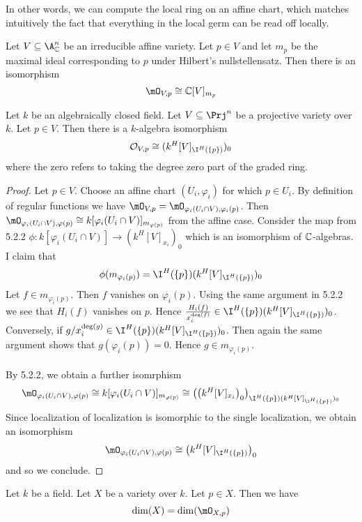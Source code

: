 \documentclass[a4paper]{article}
\begin{document}
In other words, we can compute the local ring on an affine chart, which matches intuitively the fact that everything in the local germ can be read off locally. 

\begin{prp}{}{} Let $V\subseteq\A_\C^n$ be an irreducible affine variety. Let $p\in V$ and let $m_p$ be the maximal ideal corresponding to $p$ under Hilbert's nullstellensatz. Then there is an isomorphism $$\mO_{V,p}\cong\C[V]_{m_p}$$
\end{prp}

\begin{prp}{}{} Let $k$ be an algebraically closed field. Let $V\subseteq\Prj^n$ be a projective variety over $k$. Let $p\in V$. Then there is a $k$-algebra isomorphism $$\mathcal{O}_{V,p}\cong(k^H[V]_{\I^H(\{p\})})_0$$ where the zero refers to taking the degree zero part of the graded ring. 
\begin{proof}
Let $p\in V$. Choose an affine chart $(U_i,\varphi_i)$ for which $p\in U_i$. By definition of regular functions we have $\mO_{V,p}=\mO_{\varphi_i(U_i\cap V),\varphi_i(p)}$.  Then $\mO_{\varphi_i(U_i\cap V),\varphi(p)}\cong k[\varphi_i(U_i\cap V)]_{m_{\varphi(p)}}$ from the affine case. Consider the map from 5.2.2 $\phi:k[\varphi_i(U_i\cap V)]\to (k^H[V]_{x_i})_0$ which is an isomorphism of $\mathbb{C}$-algebras. I claim that $$\phi(m_{\varphi_i(p)})=\I^H(\{p\})(k^H[V]_{\I^H(\{p\})})_0$$ Let $f\in m_{\varphi_i(p)}$. Then $f$ vanishes on $\varphi_i(p)$. Using the same argument in 5.2.2 we see that $H_i(f)$ vanishes on $p$. Hence $\frac{H_i(f)}{x_i^{\deg(f)}}\in\I^H(\{p\})(k^H[V]_{\I^H(\{p\})})_0$. Conversely, if $g/x_i^{\deg(g)}\in\I^H(\{p\})(k^H[V]_{\I^H(\{p\})})_0$. Then again the same argument shows that $g(\varphi_i(p))=0$. Hence $g\in m_{\varphi_i(p)}$. \\~\\

By 5.2.2, we obtain a further isomrphism $$\mO_{\varphi_i(U_i\cap V),\varphi(p)}\cong k[\varphi_i(U_i\cap V)]_{m_{\varphi(p)}}\cong\left(\left(k^H[V]_{x_i}\right)_0\right)_{\I^H(\{p\})(k^H[V]_{\I^H(\{p\})})_0}$$ Since localization of localization is isomorphic to the single localization, we obtain an isomorphism $$\mO_{\varphi_i(U_i\cap V),\varphi(p)}\cong\left(k^H[V]_{\I^H(\{p\})}\right)_0$$ and so we conclude. 
\end{proof}
\end{prp}

\begin{prp}{}{} Let $k$ be a field. Let $X$ be a variety over $k$. Let $p\in X$. Then we have $$\dim(X)=\dim(\mO_{X,p})$$
\end{prp}
\end{document}

